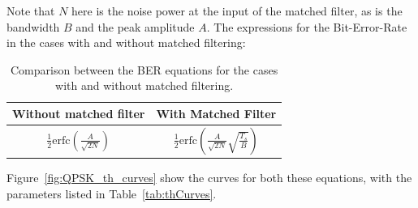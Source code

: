 \begin{refsection}

%



Note that $N$ here is the noise power at the input of the matched filter, as is the bandwidth $B$ and the peak amplitude $A$. The expressions for the Bit-Error-Rate in the cases with and without matched filtering:

\begin{table}[H]
	\centering
	\begin{tabulary}{1.0\textwidth}{|c|c|}
		\hline
		\textbf{Without matched filter} 								& \textbf{With Matched Filter} \\ \hline
		$ \frac{1}{2} \text{erfc} \left( \frac{A}{\sqrt{2N}} \right) $	& $ \frac{1}{2} \text{erfc}\left(\frac{A}{\sqrt{2N}} \sqrt{\frac{T_s}{B}}\right)  $ \\ \hline
	\end{tabulary}
	
	\caption{Comparison between the BER equations for the cases with and without matched filtering.\label{tab:ber_qpsk}}
\end{table}

Figure~\ref{fig:QPSK_th_curves} show the curves for both these equations, with the parameters listed in Table~\ref{tab:thCurves}.


\end{refsection}
